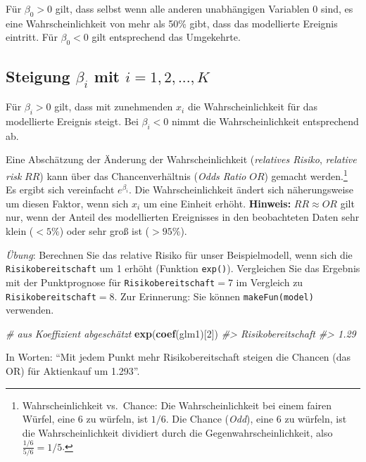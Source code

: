 \documentclass[12pt,]{book}
\makeatletter
\newenvironment{Shaded}{\begin{snugshade}}{\end{snugshade}}
\newcommand{\KeywordTok}[1]{\textcolor[rgb]{0.13,0.29,0.53}{\textbf{{#1}}}}
\newcommand{\DecValTok}[1]{\textcolor[rgb]{0.00,0.00,0.81}{{#1}}}
\newcommand{\CommentTok}[1]{\textcolor[rgb]{0.56,0.35,0.01}{\textit{{#1}}}}
\newcommand{\NormalTok}[1]{{#1}}
\newenvironment{kframe}{%
\medskip{}
\setlength{\fboxsep}{.8em}
 \def\at@end@of@kframe{}%
 \ifinner\ifhmode%
  \def\at@end@of@kframe{\end{minipage}}%
  \begin{minipage}{\columnwidth}%
 \fi\fi%
 \def\FrameCommand##1{\hskip\@totalleftmargin \hskip-\fboxsep
 \colorbox{shadecolor}{##1}\hskip-\fboxsep
     \hskip-\linewidth \hskip-\@totalleftmargin \hskip\columnwidth}%
 \MakeFramed {\advance\hsize-\width
   \@totalleftmargin\z@ \linewidth\hsize
   \@setminipage}}%
 {\par\unskip\endMakeFramed%
 \at@end@of@kframe}
\renewenvironment{Shaded}{\begin{kframe}}{\end{kframe}}
\makeatother
\begin{document}
Für \(\beta_0>0\) gilt, dass selbst wenn alle anderen unabhängigen
Variablen \(0\) sind, es eine Wahrscheinlichkeit von mehr als 50\% gibt,
dass das modellierte Ereignis eintritt. Für \(\beta_0<0\) gilt
entsprechend das Umgekehrte.

\subsection{\texorpdfstring{Steigung \(\beta_i\) mit
\(i=1,2,...,K\)}{Steigung \textbackslash{}beta\_i mit i=1,2,...,K}}\label{steigung-beta_i-mit-i12...k}

Für \(\beta_i>0\) gilt, dass mit zunehmenden \(x_i\) die
Wahrscheinlichkeit für das modellierte Ereignis steigt. Bei
\(\beta_i<0\) nimmt die Wahrscheinlichkeit entsprechend ab.

Eine Abschätzung der Änderung der Wahrscheinlichkeit (\emph{relatives
Risiko}, \emph{relative risk} \(RR\)) kann über das Chancenverhältnis
(\emph{Odds Ratio} \(OR\)) gemacht werden.\footnote{Wahrscheinlichkeit
  vs.~Chance: Die Wahrscheinlichkeit bei einem fairen Würfel, eine 6 zu
  würfeln, ist \(1/6\). Die Chance (\emph{Odd}), eine 6 zu würfeln, ist
  die Wahrscheinlichkeit dividiert durch die Gegenwahrscheinlichkeit,
  also \(\frac{1/6}{5/6}=1/5\).} Es ergibt sich vereinfacht
\(e^{\beta_i}\). Die Wahrscheinlichkeit ändert sich näherungsweise um
diesen Faktor, wenn sich \(x_i\) um eine Einheit erhöht.
\textbf{Hinweis:} \(RR\approx OR\) gilt nur, wenn der Anteil des
modellierten Ereignisses in den beobachteten Daten sehr klein (\(<5\%\))
oder sehr groß ist (\(>95\%\)).

\emph{Übung}: Berechnen Sie das relative Risiko für unser
Beispielmodell, wenn sich die \texttt{Risikobereitschaft} um 1 erhöht
(Funktion \texttt{exp()}). Vergleichen Sie das Ergebnis mit der
Punktprognose für \texttt{Risikobereitschaft}\(=7\) im Vergleich zu
\texttt{Risikobereitschaft}\(=8\). Zur Erinnerung: Sie können
\texttt{makeFun(model)} verwenden.

\begin{Shaded}
\begin{Highlighting}[]
\CommentTok{# aus Koeffizient abgeschätzt}
\KeywordTok{exp}\NormalTok{(}\KeywordTok{coef}\NormalTok{(glm1)[}\DecValTok{2}\NormalTok{])}
\CommentTok{#> Risikobereitschaft }
\CommentTok{#>               1.29}
\end{Highlighting}
\end{Shaded}

In Worten: ``Mit jedem Punkt mehr Risikobereitschaft steigen die Chancen
(das OR) für Aktienkauf um 1.293''.
\end{document}
